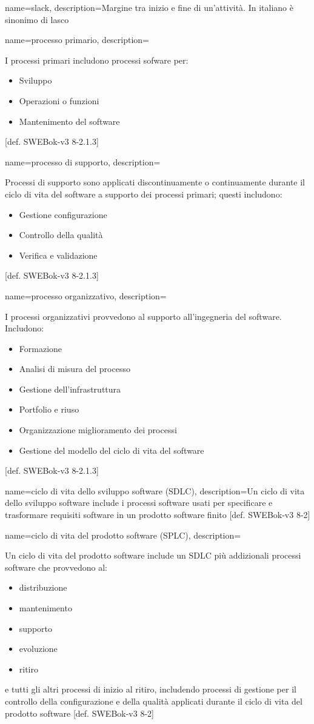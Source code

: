 {
name=slack,
description={Margine tra inizio e fine di un'attivit\`a. In italiano \`e sinonimo di lasco}
}

{
name=processo primario,
description={I processi primari includono processi sofware per: \begin{itemize}
\item Sviluppo
\item Operazioni o funzioni
\item Mantenimento del software
\end{itemize}
[def. SWEBok-v3 8-2.1.3]}
}

{
name=processo di supporto,
description={Processi di supporto sono applicati discontinuamente o continuamente durante il ciclo di vita del software a supporto dei processi primari; questi includono:\begin{itemize}
\item Gestione configurazione
\item Controllo della qualit\`a
\item Verifica e validazione
\end{itemize}
[def. SWEBok-v3 8-2.1.3]}
}

{
name=processo organizzativo,
description={I processi organizzativi provvedono al supporto all'ingegneria del software. Includono: \begin{itemize}
\item Formazione
\item Analisi di misura del processo
\item Gestione dell'infrastruttura
\item Portfolio e riuso
\item Organizzazione miglioramento dei processi
\item Gestione del modello del ciclo di vita del software
\end{itemize}
[def. SWEBok-v3 8-2.1.3]}
}

{
name=ciclo di vita dello sviluppo software (SDLC),
description={Un ciclo di vita dello sviluppo software include i processi software usati per specificare e trasformare requisiti software in un prodotto software finito [def. SWEBok-v3 8-2]}
}

{
name=ciclo di vita del prodotto software (SPLC),
description={Un ciclo di vita del prodotto software include un SDLC pi\`u addizionali processi software che provvedono al: \begin{itemize}
\item distribuzione
\item mantenimento
\item supporto
\item evoluzione
\item ritiro
\end{itemize}
e tutti gli altri processi di inizio al ritiro, includendo processi di gestione per il controllo della configurazione e della qualit\`a applicati durante il ciclo di vita del prodotto software [def. SWEBok-v3 8-2]}
}

